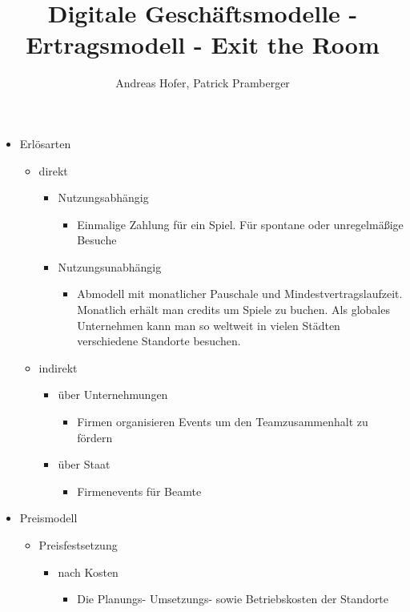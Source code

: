 \documentclass{article}
\title{\vspace{-1cm}Digitale Geschäftsmodelle - Ertragsmodell - Exit the Room}
\author{Andreas Hofer, Patrick Pramberger}
\begin{document}
	\maketitle
	\begin{itemize}
		\item{Erlösarten}
		\begin{itemize}
			\item{direkt}
			\begin{itemize}
				\item{Nutzungsabhängig}
				\begin{itemize}
					\item{Einmalige Zahlung für ein Spiel. Für spontane oder unregelmäßige Besuche}
				\end{itemize}
				\item{Nutzungsunabhängig}
				\begin{itemize}
					\item{Abmodell mit monatlicher Pauschale und Mindestvertragslaufzeit. Monatlich erhält man credits um Spiele zu buchen. Als globales Unternehmen kann man so weltweit in vielen Städten verschiedene Standorte besuchen.}
				\end{itemize}
			\end{itemize}
			\item{indirekt}
			\begin{itemize}
				\item{über Unternehmungen}
				\begin{itemize}
					\item{Firmen organisieren Events um den Teamzusammenhalt zu fördern}
				\end{itemize}
				\item{über Staat}
				\begin{itemize}
					\item{Firmenevents für Beamte}
				\end{itemize}
			\end{itemize}
		\end{itemize}
		\item{Preismodell}
		\begin{itemize}
			\item{Preisfestsetzung}
			\begin{itemize}
				\item{nach Kosten}
				\begin{itemize}
					\item{Die Planungs- Umsetzungs- sowie Betriebskosten der Standorte}
				\end{itemize}

\end{itemize}
\end{itemize}
\end{itemize}
\end{document}
